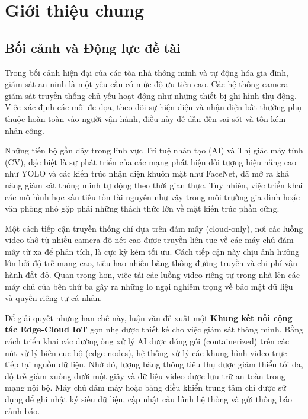 \documentclass[12pt,a4paper]{article}
\begin{document}
\section{Giới thiệu chung}

\subsection{Bối cảnh và Động lực đề tài}
Trong bối cảnh hiện đại của các tòa nhà thông minh và tự động hóa gia đình, giám sát an ninh là một yêu cầu có mức độ ưu tiên cao. Các hệ thống camera giám sát truyền thống chủ yếu hoạt động như những thiết bị ghi hình thụ động. Việc xác định các mối đe dọa, theo dõi sự hiện diện và nhận diện bất thường phụ thuộc hoàn toàn vào người vận hành, điều này dễ dẫn đến sai sót và tốn kém nhân công.

Những tiến bộ gần đây trong lĩnh vực Trí tuệ nhân tạo (AI) và Thị giác máy tính (CV), đặc biệt là sự phát triển của các mạng phát hiện đối tượng hiệu năng cao như YOLO và các kiến trúc nhận diện khuôn mặt như FaceNet, đã mở ra khả năng giám sát thông minh tự động theo thời gian thực. Tuy nhiên, việc triển khai các mô hình học sâu tiêu tốn tài nguyên như vậy trong môi trường gia đình hoặc văn phòng nhỏ gặp phải những thách thức lớn về mặt kiến trúc phần cứng.

Một cách tiếp cận truyền thống chỉ dựa trên đám mây (cloud-only), nơi các luồng video thô từ nhiều camera độ nét cao được truyền liên tục về các máy chủ đám mây từ xa để phân tích, là cực kỳ kém tối ưu. Cách tiếp cận này chịu ảnh hưởng lớn bởi độ trễ mạng cao, tiêu hao nhiều băng thông đường truyền và chi phí vận hành đắt đỏ. Quan trọng hơn, việc tải các luồng video riêng tư trong nhà lên các máy chủ của bên thứ ba gây ra những lo ngại nghiêm trọng về bảo mật dữ liệu và quyền riêng tư cá nhân.

Để giải quyết những hạn chế này, luận văn đề xuất một \textbf{Khung kết nối cộng tác Edge-Cloud IoT} gọn nhẹ được thiết kế cho việc giám sát thông minh. Bằng cách triển khai các đường ống xử lý AI được đóng gói (containerized) trên các nút xử lý biên cục bộ (edge nodes), hệ thống xử lý các khung hình video trực tiếp tại nguồn dữ liệu. Nhờ đó, lượng băng thông tiêu thụ được giảm thiểu tối đa, độ trễ giảm xuống dưới một giây và dữ liệu video được lưu trữ an toàn trong mạng nội bộ. Máy chủ đám mây hoặc bảng điều khiển trung tâm chỉ được sử dụng để ghi nhật ký siêu dữ liệu, cập nhật cấu hình hệ thống và gửi thông báo cảnh báo.
\end{document}

